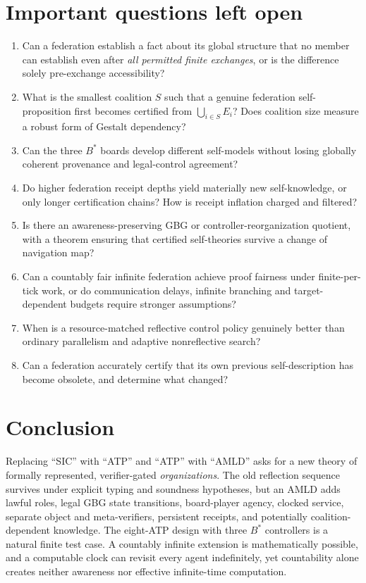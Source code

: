 \documentclass[10pt,letterpaper]{article}
\theoremstyle{remark}\newtheorem{remark}[definition]{Remark}
\begin{document}
\section{Important questions left open}
\begin{enumerate}
\item Can a federation establish a fact about its global structure that no member can establish even after \emph{all permitted finite exchanges}, or is the difference solely pre-exchange accessibility?
\item What is the smallest coalition $S$ such that a genuine federation self-proposition first becomes certified from $\bigcup_{i\in S}E_i$? Does coalition size measure a robust form of Gestalt dependency?
\item Can the three $B^*$ boards develop different self-models without losing globally coherent provenance and legal-control agreement?
\item Do higher federation receipt depths yield materially new self-knowledge, or only longer certification chains? How is receipt inflation charged and filtered?
\item Is there an awareness-preserving GBG or controller-reorganization quotient, with a theorem ensuring that certified self-theories survive a change of navigation map?
\item Can a countably fair infinite federation achieve proof fairness under finite-per-tick work, or do communication delays, infinite branching and target-dependent budgets require stronger assumptions?
\item When is a resource-matched reflective control policy genuinely better than ordinary parallelism and adaptive nonreflective search?
\item Can a federation accurately certify that its own previous self-description has become obsolete, and determine what changed?
\end{enumerate}

\section{Conclusion}
Replacing ``SIC'' with ``ATP'' and ``ATP'' with ``AMLD'' asks for a new theory of formally represented, verifier-gated \emph{organizations}. The old reflection sequence survives under explicit typing and soundness hypotheses, but an AMLD adds lawful roles, legal GBG state transitions, board-player agency, clocked service, separate object and meta-verifiers, persistent receipts, and potentially coalition-dependent knowledge. The eight-ATP design with three $B^*$ controllers is a natural finite test case. A countably infinite extension is mathematically possible, and a computable clock can revisit every agent indefinitely, yet countability alone creates neither awareness nor effective infinite-time computation.
\end{document}
